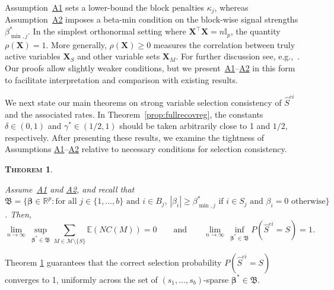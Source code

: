 \documentclass[
  12pt]{article}
\newcommand{\E}{\mathbb{E}}
\newcommand{\R}{\mathbb{R}}
\newcommand{\I}{\mathbb{I}}
\newcommand{\M}{\mathcal{M}}
\newcommand{\bbeta}{\boldsymbol{\beta}}
\newcommand{\bX}{\mathbf{X}}
\newtheorem{thm}{\textsc{Theorem}}[section]
\begin{document}
Assumption~\hyperlink{lab:A1}{A1} sets a lower-bound the block penalties $\kappa_j$, whereas Assumption~\hyperlink{lab:A2}{A2} imposes a beta-min condition on the block-wise signal strengths $\beta_{\min,j}^*$.
In the simplest orthonormal setting where $\bX^{\top}\bX=n\I_p$, the quantity $\rho(\bX)=1$. More generally, 
$\rho(\bX)\ge 0$ measures the correlation between truly active variables $\bX_S$ and other variable sets $\bX_M$. For further discussion see, e.g.,~\cite{infotheowainwright}.
Our proofs allow slightly weaker conditions, but we present~\hyperlink{lab:A1}{A1}--\hyperlink{lab:A2}{A2} in this form to facilitate interpretation and comparison with existing results.

We next state our main theorems on strong variable selection consistency of $\hat{S}^{ei}$ and the associated rates. In Theorem~\ref{prop:fullrecovreg}, the constants $\delta\in(0,1)$ and $\gamma^*\in(1/2,1)$ should be taken arbitrarily close to 1 and $1/2$, respectively. After presenting these results, we examine the tightness of Assumptions \hyperlink{lab:A1}{A1}–\hyperlink{lab:A2}{A2} relative to necessary conditions for selection consistency.

\begin{thm}\label{theo:suffcondlinearmodel}

Assume~\hyperlink{lab:A1}{A1} and \hyperlink{lab:A2}{A2}, and recall that $\mathfrak{B}=\{\bbeta \in \R^p: \text{for all }j \in \{1,\ldots,b\} \text{ and }i \in B_j,\, |\beta_i|\geq  \beta^*_{\min,j} \text{ if } i\in S_j \text{ and }  \beta_i= 0 \text{ otherwise}\}$. Then,
\[\lim_{n \to \infty}\, \sup_{\bbeta^*\in\mathfrak{B}}\sum_{M \in \M\setminus \{S\}}\E\left(NC(M)\right)= 0 \qquad \mbox{and} \qquad \lim_{n \to \infty}\, \inf_{\bbeta^*\in\mathfrak{B}} P(\hat{S}^{ei} = S)= 1.\]
\end{thm}

Theorem \ref{theo:suffcondlinearmodel} guarantees that the correct selection probability $P(\hat{S}^{ei} = S)$ converges to 1, uniformly across the set of $(s_1,\ldots,s_b)$-sparse $\bbeta^* \in \mathfrak{B}$.
 
\end{document}
